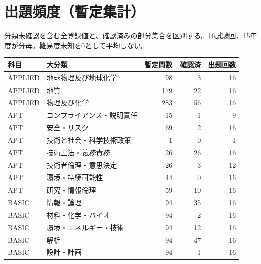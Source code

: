 \chapter{出題頻度（暫定集計）}
分類未確認を含む全登録値と、確認済みの部分集合を区別する。16試験回、15年度が分母。難易度未知を0として平均しない。
\begin{longtable}{p{.16\linewidth}p{.42\linewidth}rrr}
科目 & 大分類 & 暫定問数 & 確認済 & 出題回数\\\hline
APPLIED & 地球物理及び地球化学 & 98 & 3 & 16\\
APPLIED & 地質 & 179 & 22 & 16\\
APPLIED & 物理及び化学 & 283 & 56 & 16\\
APT & コンプライアンス・説明責任 & 15 & 1 & 9\\
APT & 安全・リスク & 69 & 2 & 16\\
APT & 技術と社会・科学技術政策 & 1 & 0 & 1\\
APT & 技術士法・義務責務 & 26 & 26 & 16\\
APT & 技術者倫理・意思決定 & 26 & 3 & 12\\
APT & 環境・持続可能性 & 44 & 0 & 16\\
APT & 研究・情報倫理 & 59 & 10 & 16\\
BASIC & 情報・論理 & 94 & 35 & 16\\
BASIC & 材料・化学・バイオ & 94 & 2 & 16\\
BASIC & 環境・エネルギー・技術 & 94 & 12 & 16\\
BASIC & 解析 & 94 & 47 & 16\\
BASIC & 設計・計画 & 94 & 1 & 16\\
\end{longtable}
